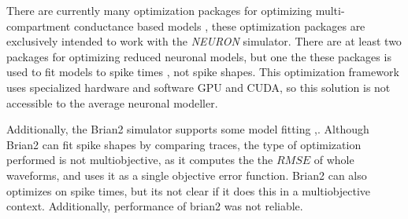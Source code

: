 



There are currently many optimization packages for optimizing multi-compartment conductance based models \citep{friedrich2014flexible} \citep{bluepyopt} \citep{neurotune},  these optimization packages are exclusively intended to work with the \emph{NEURON} simulator. There are at least two packages for optimizing reduced neuronal models, but one the these packages is used to fit models to spike times \citep{rossant2010automatic}, not spike shapes. This optimization framework uses specialized hardware and software GPU and CUDA, so this solution is not accessible to the average neuronal modeller.

Additionally, the Brian2 simulator supports some model fitting
\citep{brian2modelfitting},\citep{stimberg2019brian}. Although Brian2 can fit spike shapes by comparing traces, the type of optimization performed is not multiobjective, as it computes the the $RMSE$ of whole waveforms, and uses it as a single objective error function. Brian2 can also optimizes on spike times, but its not clear if it does this in a multiobjective context. Additionally, performance of brian2 was not reliable.

